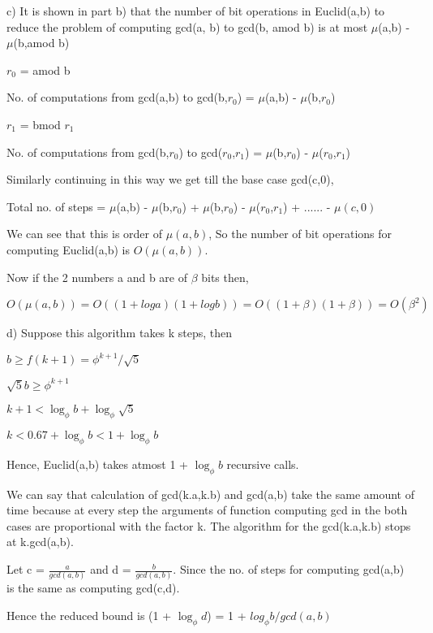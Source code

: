 \documentclass[12pt]{article}
\begin{document}
\begin{enumerate}
    c) It is shown in part b) that the number of bit operations in Euclid(a,b) to reduce the problem of computing gcd(a, b) to gcd(b, amod b) is at most $\mu$(a,b) - $\mu$(b,amod b)
    
    $r_0$ = amod b
    
    No. of computations from gcd(a,b) to gcd(b,$r_0$) = $\mu$(a,b) - $\mu$(b,$r_0$)
    
    $r_1$ = bmod $r_1$
    
    No. of computations from gcd(b,$r_0$) to gcd($r_0$,$r_1$) = $\mu$(b,$r_0$) - $\mu$($r_0$,$r_1$)
    
    Similarly continuing in this way we get till the base case gcd(c,0),
    
    Total no. of steps = $\mu$(a,b) - $\mu$(b,$r_0$) + $\mu$(b,$r_0$) - $\mu$($r_0$,$r_1$) + ...... - $\mu(c,0)$
    
    We can see that this is order of $\mu(a,b)$, So the number of bit operations for computing Euclid(a,b) is $O(\mu(a,b))$.
    
    Now if the 2 numbers a and b are of $\beta$ bits then,
    
    \[ O(\mu(a,b)) = O((1+loga)(1+logb)) = O((1+\beta)(1+\beta)) = O(\beta^2) \]
    
    d) Suppose this algorithm takes k steps, then
    
    $b \geq f(k+1) = \phi^{k+1}/ \sqrt{5} $
    
    $ \sqrt{5}b \geq \phi^{k+1} $
    
    $ k+1 < \log_\phi b + \log_\phi\sqrt{5} $
    
    $ k < 0.67 + \log_\phi b < 1 + \log_\phi b $
    
    Hence, Euclid(a,b) takes atmost 1 + $\log_\phi b$ recursive calls.
    
    We can say that calculation of gcd(k.a,k.b) and gcd(a,b) take the same amount of time because at every step the arguments of function computing gcd in the both cases are proportional with the factor k. The algorithm for the gcd(k.a,k.b) stops at k.gcd(a,b).
    
    Let c = $\frac{a}{gcd(a,b)}$ and d = $\frac{b}{gcd(a,b)}$. Since the no. of steps for computing gcd(a,b) is the same as computing gcd(c,d).
    
    Hence the reduced bound is (1 + $\log_\phi d$) = 1 + $log_\phi b/gcd(a,b)$
    

\end{enumerate}
\end{document}
